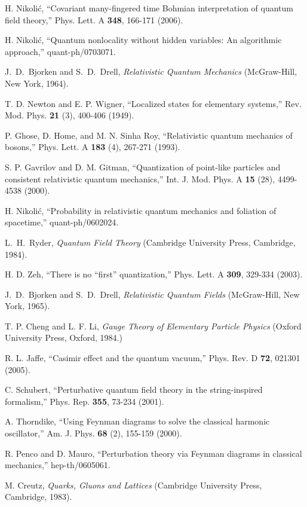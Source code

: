 \documentclass[12pt]{article}
\begin{document}
\begin{thebibliography}{99}
H. Nikoli\'c,
``Covariant many-fingered time Bohmian interpretation of quantum field
theory,''
Phys. Lett. A {\bf 348}, 166-171 (2006).

H. Nikoli\'c,
``Quantum nonlocality without hidden variables: An algorithmic approach,''
quant-ph/0703071.

J.~D.~Bjorken and S.~D.~Drell, {\it Relativistic Quantum Mechanics}
(McGraw-Hill, New York, 1964).

T. D. Newton and E. P. Wigner, 
``Localized states for elementary systems,''
Rev. Mod. Phys. {\bf 21} (3), 400-406 (1949).

P. Ghose, D. Home, and M. N. Sinha Roy,
``Relativistic quantum mechanics of bosons,''
Phys. Lett. A {\bf 183} (4), 267-271 (1993). 

S. P. Gavrilov and D. M. Gitman, 
``Quantization of point-like particles and consistent relativistic 
quantum mechanics,''
Int. J. Mod. Phys. A {\bf 15} (28), 4499-4538 (2000). 

H. Nikoli\'c, 
``Probability in relativistic quantum mechanics
and foliation of spacetime,''
quant-ph/0602024.

L.~H.~Ryder, {\it Quantum Field Theory} (Cambridge University Press,
Cambridge, 1984).

H. D. Zeh,
``There is no ``first'' quantization,''
Phys. Lett. A {\bf 309}, 329-334 (2003).

J.~D.~Bjorken and S.~D.~Drell, {\it Relativistic Quantum Fields}
(McGraw-Hill, New York, 1965).

T. P. Cheng and L. F. Li, {\it Gauge Theory of Elementary 
Particle Physics} (Oxford University Press, Oxford, 1984.)

R. L. Jaffe, 
``Casimir effect and the quantum vacuum,''
Phys. Rev. D {\bf 72}, 021301 (2005).

C. Schubert,
``Perturbative quantum field theory in the string-inspired formalism,''
Phys. Rep. {\bf 355}, 73-234 (2001).

A. Thorndike,
``Using Feynman diagrams to solve the classical harmonic 
oscillator,''
Am. J. Phys. {\bf 68} (2), 155-159 (2000).

R. Penco and D. Mauro,
``Perturbation theory via Feynman diagrams in classical mechanics,''
hep-th/0605061.

M. Creutz,
{\it Quarks, Gluons and Lattices}
(Cambridge University Press, Cambridge, 1983).


\end{thebibliography}
\end{document}
